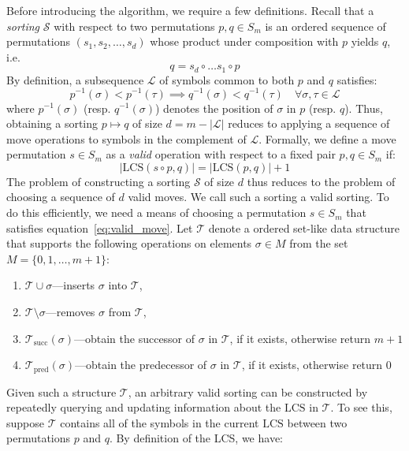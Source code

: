 \documentclass{article} %
\begin{document}
 Before introducing the algorithm, we require a few definitions. Recall that a \emph{sorting} $\mathcal{S}$ with respect to two permutations $p, q \in S_m$ is an ordered sequence of permutations $(s_1, s_2, \dots, s_d)$ whose product under composition with $p$ yields $q$, i.e.
 $$ q = s_d \circ \dots s_1 \circ p $$
By definition, a subsequence $\mathcal{L}$ of symbols common to both $p$ and $q$ satisfies:
 $$ p^{-1}(\sigma) < p^{-1}(\tau) \implies q^{-1}(\sigma) < q^{-1}(\tau) \quad \forall \sigma, \tau \in \mathcal{L} $$
 where $p^{-1}(\sigma)$ (resp. $q^{-1}(\sigma)$) denotes the position of $\sigma$ in $p$ (resp. $q$). Thus, obtaining a sorting $p \mapsto q$ of size $d = m - \lvert \mathcal{L} \rvert$ reduces to applying a sequence of move operations to symbols in the complement of $\mathcal{L}$. 
 Formally, we define a move permutation $s \in S_m$ as a \emph{valid} operation with respect to a fixed pair $p, q \in S_m$ if:
 \begin{equation}\label{eq:valid_move}
 	\lvert \mathrm{LCS}(s \circ p, q) \rvert = \lvert \mathrm{LCS}(p,q) \rvert + 1
 \end{equation}
  The problem of constructing a sorting $\mathcal{S}$ of size $d$ thus reduces to the problem of choosing a sequence of $d$ valid moves. We call such a sorting a valid sorting. To do this efficiently, we need a means of choosing a permutation $s \in S_m$ that satisfies equation~\ref{eq:valid_move}. 
  Let $\mathcal{T}$ denote a ordered set-like data structure that supports the following operations on elements $\sigma \in M$ from the set $M = \{0, 1, \dots, m+1\}$:
  \begin{enumerate}
  	\item $\mathcal{T} \cup \sigma$---inserts $\sigma$ into $\mathcal{T}$,
  	\item $\mathcal{T} \setminus \sigma$---removes $\sigma$ from $\mathcal{T}$,
  	\item $\mathcal{T}_{\mathrm{succ}}(\sigma)$---obtain the successor of $\sigma$ in $\mathcal{T}$, if it exists, otherwise return $m+1$
  	\item $\mathcal{T}_{\mathrm{pred}}(\sigma)$---obtain the predecessor of $\sigma$ in $\mathcal{T}$, if it exists, otherwise return $0$
  \end{enumerate}
  Given such a structure $\mathcal{T}$, an arbitrary valid sorting can be constructed by repeatedly querying and updating information about the $\mathrm{LCS}$ in $\mathcal{T}$. To see this, suppose $\mathcal{T}$ contains all of the symbols in the current $\mathrm{LCS}$ between two permutations $p$ and $q$. By definition of the LCS, we have:
\end{document}

